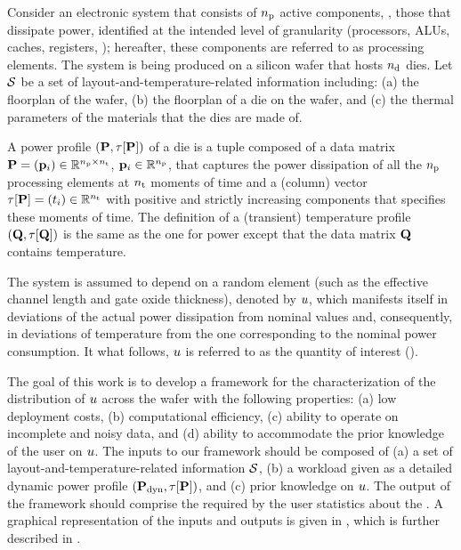 Consider an electronic system that consists of ${n_\text{p}}$ active components, \ie, those that dissipate power, identified at the intended level of granularity (processors, ALUs, caches, registers, \etc); hereafter, these components are referred to as processing elements.
The system is being produced on a silicon wafer that hosts ${n_\text{d}}$ dies.
Let $\mathcal{S}$ be a set of layout-and-temperature-related information including: (a) the floorplan of the wafer, (b) the floorplan of a die on the wafer, and (c) the thermal parameters of the materials that the dies are made of.

A power profile $\profileP$ of a die is a tuple composed of a data matrix $\mathbf{P} = (\mathbf{p}_i) \in \mathbb{R}^{{n_\text{p}} \times {n_\text{t}}}$, $\mathbf{p}_i \in \mathbb{R}^{n_\text{p}}$, that captures the power dissipation of all the ${n_\text{p}}$ processing elements at ${n_\text{t}}$ moments of time and a (column) vector $\tau[\mathbf{P}] = (t_i) \in \mathbb{R}^{{n_\text{t}}}$ with positive and strictly increasing components that specifies these moments of time.
The definition of a (transient) temperature profile $\profileT$ is the same as the one for power except that the data matrix $\mathbf{Q}$ contains temperature.

The system is assumed to depend on a random element (such as the effective channel length and gate oxide thickness), denoted by $u$, which manifests itself in deviations of the actual power dissipation from nominal values and, consequently, in deviations of temperature from the one corresponding to the nominal power consumption. It what follows, $u$ is referred to as the quantity of interest (\qoi).

The goal of this work is to develop a framework for the characterization of the distribution of $u$ across the wafer with the following properties: (a) low deployment costs, (b) computational efficiency, (c) ability to operate on incomplete and noisy data, and (d) ability to accommodate the prior knowledge of the user on $u$.
The inputs to our framework should be composed of (a) a set of layout-and-temperature-related information $\mathcal{S}$, (b) a workload given as a detailed dynamic power profile $(\mathbf{P}_{\text{dyn}}, \tau[\mathbf{P}])$, and (c) prior knowledge on $u$.
The output of the framework should comprise the required by the user statistics about the \qoi.
A graphical representation of the inputs and outputs is given in , which is further described in .

